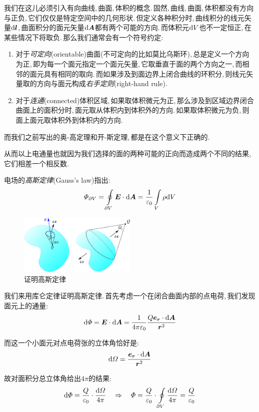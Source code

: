 我们在这儿必须引入有向曲线,\,曲面,\,体积的概念.\,固然,\,曲线,\,曲面,\,体积都没有方向与正负,\,它们仅仅是特定空间中的几何形状.\,但定义各种积分时,\,曲线积分的线元矢量$\textrm{d}\boldsymbol{l}$,\,曲面积分的面元矢量$\textrm{d}\boldsymbol{A}$都有两个可能的方向.\,而体积元$\textrm{d} V$也不一定恒正,\,在某些情况下将取负.\,那么我们通常会有一个符号约定:

\begin{enumerate}
	\item 对于\emph{可定向}(orientable)曲面(不可定向的比如莫比乌斯环),\,总是定义一个方向为正,\,即为每一个面元指定一个面元矢量,\,它取垂直于面的两个方向之一,\,而相邻的面元具有相同的取向.\,而如果涉及到面边界上闭合曲线的环积分,\,则线元矢量取的方向与面元构成\emph{右手定则}(right-hand rule).
	\item 对于\emph{连通}(connected)体积区域,\,如果取体积微元为正,\,那么涉及到区域边界闭合曲面上的面积分时,\,面元取从体积内到体积外的方向.\,如果取体积微元为负,\,则面上面元取体积外到体积内的方向.
\end{enumerate}

而我们之前写出的奥-高定理和开-斯定理,\,都是在这个意义下正确的.

从而以上电通量也就因为我们选择的面的两种可能的正向而造成两个不同的结果,\,它们相差一个相反数.

电场的\emph{高斯定律}(Gauss's law)指出:
\[\varPhi_{\partial V}=\oint\limits_{\partial V} \boldsymbol{E}\cdot\textrm{d} \boldsymbol{A}=\frac{1}{\varepsilon_0}\int\limits_V \rho\textrm{d} V\]

\begin{figure}[H]
\centering
\includegraphics[width=0.5\textwidth]{image/7-1-6.png}
\caption{证明高斯定律}
\end{figure}

我们来用库仑定律证明高斯定律.\,首先考虑一个在闭合曲面内部的点电荷,\,我们发现面元上的通量:
\[\textrm{d} \varPhi=\boldsymbol{E}\cdot\textrm{d} \boldsymbol{A}=\frac{1}{4\pi\varepsilon_0} \frac{Q\boldsymbol{e}_{\boldsymbol{r}}\cdot\textrm{d} \boldsymbol{A}}{\boldsymbol{r}^2}\]

而这一个小面元对点电荷张的立体角恰好是:
\[\textrm{d}\varOmega=\frac{\boldsymbol{e}_{\boldsymbol{r}}\cdot\textrm{d} \boldsymbol{A}}{\boldsymbol{r}^2}\]

故对面积分总立体角给出$4\pi$的结果:
\[\textrm{d} \varPhi=\frac{Q}{\varepsilon_0}\cdot\frac{\textrm{d}\varOmega}{4\pi}\quad \Rightarrow\quad \varPhi=\frac{Q}{\varepsilon_0}\cdot\oint\limits_{\partial V}\frac{\textrm{d}\varOmega}{4\pi}=\frac{Q}{\varepsilon_0}\]

